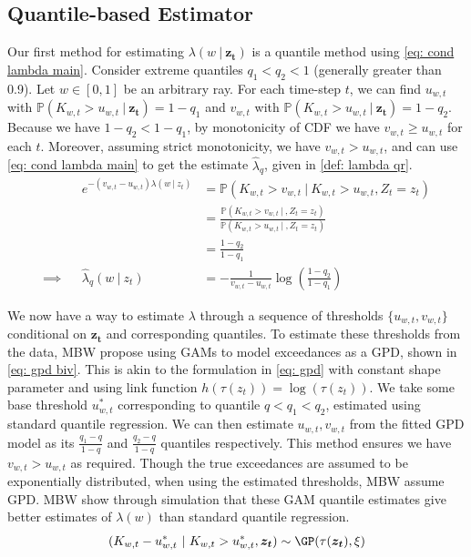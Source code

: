 \documentclass[12pt]{article}
\begin{document}
  \subsection{Quantile-based Estimator} \label{sec: quant est}
    Our first method for estimating $\lambda(w \ |\ \boldsymbol{z_t})$ is a quantile method using \cref{eq: cond lambda main}.
    Consider extreme quantiles $q_1 < q_2 < 1$ (generally greater than 0.9). Let $w \in [0, 1]$ be an arbitrary ray.
    For each time-step $t$, we can find $u_{w, t}$ with $ \mathbb{P}(K_{w, t} > u_{w, t}  \ |\  \boldsymbol{z_t}) = 1 - q_1$ and $v_{w, t}$ with $ \mathbb{P}(K_{w, t} > u_{w, t}  \ |\  \boldsymbol{z_t}) = 1 - q_2$.
    Because we have $1 - q_2 < 1 - q_1$, by monotonicity of CDF we have $v_{w, t} \geq u_{w, t}$ for each $t$. 
    Moreover, assuming strict monotonicity, we have $v_{w, t} > u_{w, t}$, and can use \cref{eq: cond lambda main} to get the estimate $\hat{\lambda}_q$, given in \cref{def: lambda qr}.
    \begin{align} 
      && e^{-(v_{w, t} - u_{w, t}) \lambda(w \ |\ z_t)} &= \mathbb{P}(K_{w, t} > v_{w, t} \ |\ K_{w, t} > u_{w, t}, Z_t = z_t) \\
      && &= \frac{\mathbb{P}(K_{w, t} > v_{w, t}  \ |\ , Z_t = z_t)}{\mathbb{P}(K_{w, t} > u_{w, t}  \ |\ , Z_t = z_t)}  \\
      && &= \frac{1 - q_2}{1 - q_1} \\
      \implies && \hat{\lambda}_q (w \ |\ z_t) &= -\frac{1}{v_{w, t} - u_{w, t}} \log \left(\frac{1 - q_2}{1 - q_1}\right) \label{def: lambda qr}
    \end{align}

    We now have a way to estimate $\lambda$ through a sequence of thresholds $\{ u_{w, t}, v_{w, t}\}$ conditional on $\boldsymbol{z_t}$ and corresponding quantiles. To estimate these thresholds from the data, MBW propose using GAMs to model exceedances as a GPD, shown in \cref{eq: gpd biv}. This is akin to the formulation in \cref{eq: gpd} with constant shape parameter and using link function $h(\tau(z_t)) = \log(\tau(z_t))$. 
    We take some base threshold $u_{w, t}^*$ corresponding to quantile $q < q_1 < q_2$, estimated using standard quantile regression. 
    We can then estimate $u_{w, t}, v_{w, t}$ from the fitted GPD model as its $\frac{q_1 - q}{1 - q}$ and $\frac{q_2 - q}{1 - q}$ quantiles respectively. This method ensures we have $v_{w, t} > u_{w, t}$ as required. Though the true exceedances are assumed to be exponentially distributed, when using the estimated thresholds, MBW assume GPD.
    MBW show through simulation that these GAM quantile estimates give better estimates of $\lambda(w)$ than standard quantile regression.
    \begin{equation} \label{eq: gpd biv}
      (K_{w, t} - u_{w, t}^* \ |\ K_{w, t} > u_{w, t}^*, \boldsymbol{z_t}) \sim \GP(\tau(\boldsymbol{z_t}), \xi)
    \end{equation}
\end{document}
